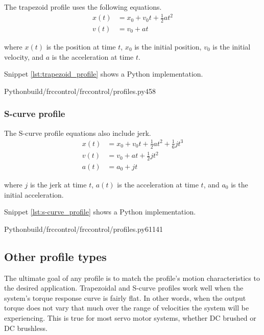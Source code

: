 The trapezoid profile uses the following equations.
\begin{align*}
  x(t) &= x_0 + v_0t + \frac{1}{2}at^2 \\
  v(t) &= v_0 + at
\end{align*}

where $x(t)$ is the position at time $t$, $x_0$ is the initial position, $v_0$
is the initial velocity, and $a$ is the acceleration at time $t$.

Snippet \ref{lst:trapezoid_profile} shows a Python implementation.
\begin{coderemotesubset}{Python}{build/frccontrol/frccontrol/profiles.py}{4}{58}
  \caption{Trapezoid profile implementation in Python}
  \label{lst:trapezoid_profile}
\end{coderemotesubset}

\subsubsection{S-curve profile}

The S-curve profile equations also include jerk.
\begin{align*}
  x(t) &= x_0 + v_0t + \frac{1}{2}at^2 + \frac{1}{6}jt^3 \\
  v(t) &= v_0 + at + \frac{1}{2}jt^2 \\
  a(t) &= a_0 + jt
\end{align*}

where $j$ is the jerk at time $t$, $a(t)$ is the acceleration at time $t$, and
$a_0$ is the initial acceleration.

Snippet \ref{lst:s-curve_profile} shows a Python implementation.
\begin{coderemotesubset}{Python}{build/frccontrol/frccontrol/profiles.py}{61}{141}
  \caption{S-curve profile implementation in Python}
  \label{lst:s-curve_profile}
\end{coderemotesubset}

\subsection{Other profile types}

The ultimate goal of any profile is to match the profile's motion
characteristics to the desired application. Trapezoidal and S-curve profiles
work well when the \gls{system}'s torque response curve is fairly flat. In other
words, when the output torque does not vary that much over the range of
velocities the \gls{system} will be experiencing. This is true for most servo
motor systems, whether DC brushed or DC brushless.

